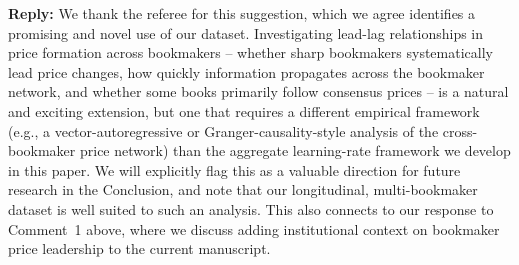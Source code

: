 \documentclass[letterpaper,12pt]{article}
\newcounter{b}
\newcommand{\Reply}[1]{\par\noindent\textbf{Reply:} #1}
\begin{document}
\begin{enumerate}
\Reply{We thank the referee for this suggestion, which we agree identifies a promising and novel use of our dataset. Investigating lead-lag relationships in price formation across bookmakers -- whether sharp bookmakers systematically lead price changes, how quickly information propagates across the bookmaker network, and whether some books primarily follow consensus prices -- is a natural and exciting extension, but one that requires a different empirical framework (e.g., a vector-autoregressive or Granger-causality-style analysis of the cross-bookmaker price network) than the aggregate learning-rate framework we develop in this paper. We will explicitly flag this as a valuable direction for future research in the Conclusion, and note that our longitudinal, multi-bookmaker dataset is well suited to such an analysis. This also connects to our response to Comment~1 above, where we discuss adding institutional context on bookmaker price leadership to the current manuscript.}



\end{enumerate}
\end{document}
